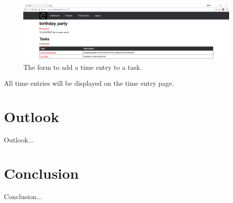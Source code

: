 \documentclass[bibliography=totoc, listof=totocnumbered]{scrartcl}
\begin{document}
\begin{figure}[h]
    \includegraphics[width=\textwidth]{trckr-project-page}
    \caption{The form to add a time entry to a task.}
    \label{fig:trckr-create-time-entry}
\end{figure}

All time entries will be displayed on the time entry page.

\section{Outlook}
Outlook...

\section{Conclusion}
Conclusion...

\clearpage
\begin{appendices}
\printbibliography
\listoffigures
\end{appendices}
\end{document}
